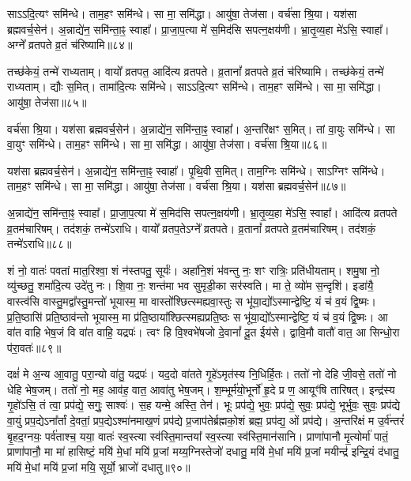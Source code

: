 साऽऽदि॒त्यꣳ समि॑न्धे। 
ताम॒हꣳ समि॑न्धे। 
सा मा॒ समि॑द्धा। 
आयु॑षा॒ तेज॑सा। 
वर्च॑सा श्रि॒या। 
यश॑सा ब्रह्मवर्च॒सेन॑। 
अ॒न्नाद्ये॑न॒ समि॑न्ता॒ꣴ॒ स्वाहा᳚। 
प्रा॒जा॒प॒त्या मे॑ स॒मिद॑सि सपत्न॒क्षय॑णी। 
भ्रा॒तृ॒व्य॒हा मे॑ऽसि॒ स्वाहा᳚। 
अग्ने᳚ व्रतपते व्र॒तं च॑रिष्यामि॥८४॥

तच्छ॑केयं॒ तन्मे॑ राध्यताम्। 
वायो᳚ व्रतपत॒ आदि॑त्य व्रतपते। 
व्र॒तानां᳚ व्रतपते व्र॒तं च॑रिष्यामि। 
तच्छ॑केयं॒ तन्मे॑ राध्यताम्। 
द्यौः स॒मित्। 
तामा॑दि॒त्यः समि॑न्धे। 
साऽऽदि॒त्यꣳ समि॑न्धे। 
ताम॒हꣳ समि॑न्धे। 
सा मा॒ समि॑द्धा। 
आयु॑षा॒ तेज॑सा॥८५॥

वर्च॑सा श्रि॒या। 
यश॑सा ब्रह्मवर्च॒सेन॑। 
अ॒न्नाद्ये॑न॒ समि॑न्ता॒ꣴ॒ स्वाहा᳚। 
अ॒न्तरि॑क्षꣳ स॒मित्। 
तां वा॒युः समि॑न्धे। 
सा वा॒युꣳ समि॑न्धे। 
ताम॒हꣳ समि॑न्धे। 
सा मा॒ समि॑द्धा। 
आयु॑षा॒ तेज॑सा। 
वर्च॑सा श्रि॒या॥८६॥

यश॑सा ब्रह्मवर्च॒सेन॑। 
अ॒न्नाद्ये॑न॒ समि॑न्ता॒ꣴ॒ स्वाहा᳚। 
पृ॒थि॒वी स॒मित्। 
ताम॒ग्निः समि॑न्धे। 
साऽग्निꣳ समि॑न्धे। 
ताम॒हꣳ समि॑न्धे। 
सा मा॒ समि॑द्धा। 
आयु॑षा॒ तेज॑सा। 
वर्च॑सा श्रि॒या। 
यश॑सा ब्रह्मवर्च॒सेन॑॥८७॥

अ॒न्नाद्ये॑न॒ समि॑न्ता॒ꣴ॒ स्वाहा᳚। 
प्रा॒जा॒प॒त्या मे॑ स॒मिद॑सि सपत्न॒क्षय॑णी। 
भ्रा॒तृ॒व्य॒हा मे॑ऽसि॒ स्वाहा᳚। 
आदि॑त्य व्रतपते व्र॒तम॑चारिषम्। 
तद॑शकं॒ तन्मे॑ऽराधि। 
वायो᳚ व्रतप॒तेऽग्ने᳚ व्रतपते। 
व्र॒तानां᳚ व्रतपते व्र॒तम॑चारिषम्। 
तद॑शकं॒ तन्मे॑ऽराधि॥८८॥
\anuvakamend[स॒मित्समि॑न्धे व्र॒तं च॑रिष्या॒म्यायु॑षा॒ तेज॑सा॒ वर्च॑सा श्रि॒या यश॑सा ब्रह्मवर्च॒सेना॒ष्टौ च॑]


शं नो॒ वातः॑ पवतां मात॒रिश्वा॒ शं न॑स्तपतु॒ सूर्यः॑। 
अहा॑नि॒शं भ॑वन्तु नः॒ शꣳ रात्रिः॒ प्रति॑धीयताम्। 
शमु॒षा नो॒ व्यु॑च्छतु॒ शमा॑दि॒त्य उदे॑तु नः। 
शि॒वा नः॒ शन्त॑मा भव सुमृडी॒का सर॑स्वति। 
मा ते॒ व्यो॑म स॒न्दृशि॑। 
इडा॑यै॒ वास्त्व॑सि वास्तु॒मद्वा᳚स्तु॒मन्तो॑ भूयास्म॒ मा वास्तो᳚श्छित्स्मह्यवा॒स्तुः स भू॑या॒द्यो᳚ऽस्मान्द्वेष्टि॒ यं च॑ व॒यं द्वि॒ष्मः। 
प्र॒ति॒ष्ठासि॑ प्रति॒ष्ठाव॑न्तो भूयास्म॒ मा प्र॑ति॒ष्ठाया᳚श्छित्स्मह्यप्रति॒ष्ठः स भू॑या॒द्यो᳚ऽस्मान्द्वेष्टि॒ यं च॑ व॒यं द्वि॒ष्मः। 
आ वा॑त वाहि भेष॒जं वि वा॑त वाहि॒ यद्रपः॑। 
त्वꣳ हि वि॒श्वभे॑षजो दे॒वानां᳚ दू॒त ईय॑से। 
द्वावि॒मौ वातौ॑ वात॒ आ सिन्धो॒रा प॑रा॒वतः॑॥८९॥

दक्षं॑ मे अ॒न्य आ॒वातु॒ परा॒न्यो वा॑तु॒ यद्रपः॑। 
यद॒दो वा॑तते गृ॒हे॑ऽमृत॑स्य नि॒धिर्\mbox{}हि॒तः। 
ततो॑ नो देहि जी॒वसे॒ ततो॑ नो धेहि भेष॒जम्। 
ततो॑ नो॒ मह॒ आव॑ह॒ वात॒ आवा॑तु भेष॒जम्। 
श॒म्भूर्म॑यो॒भूर्नो॑ हृ॒दे प्र ण॒ आयूꣳ॑षि तारिषत्। 
इन्द्र॑स्य गृ॒हो॑ऽसि॒ तं त्वा॒ प्रप॑द्ये॒ सगुः॒ साश्वः॑। 
स॒ह यन्मे॒ अस्ति॒ तेन॑। 
भूः प्रप॑द्ये॒ भुवः॒ प्रप॑द्ये॒ सुवः॒ प्रप॑द्ये॒ भूर्भुवः॒ सुवः॒ प्रप॑द्ये वा॒युं प्रप॒द्येऽना᳚र्तां दे॒वतां॒ प्रप॒द्येऽश्मा॑नमाख॒णं प्रप॑द्ये प्र॒जाप॑तेर्ब्रह्मको॒शं ब्रह्म॒ प्रप॑द्य॒ ओं प्रप॑द्ये। 
अ॒न्तरि॑क्षं म उ॒र्व॑न्तरं॑ बृ॒हद॒ग्नयः॒ पर्व॑ताश्च॒ यया॒ वातः॑ स्व॒स्त्या स्व॑स्ति॒मान्तया᳚ स्व॒स्त्या स्व॑स्ति॒मान॑सानि। 
प्राणा॑पानौ मृ॒त्योर्मा॑ पातं॒ प्राणा॑पानौ॒ मा मा॑ हासिष्टं॒ मयि॑ मे॒धां मयि॑ प्र॒जां मय्य॒ग्निस्तेजो॑ दधातु॒ मयि॑ मे॒धां मयि॑ प्र॒जां मयीन्द्र॑ इन्द्रि॒यं द॑धातु॒ मयि॑ मे॒धां मयि॑ प्र॒जां मयि॒ सूर्यो॒ भ्राजो॑ दधातु॥९०॥

